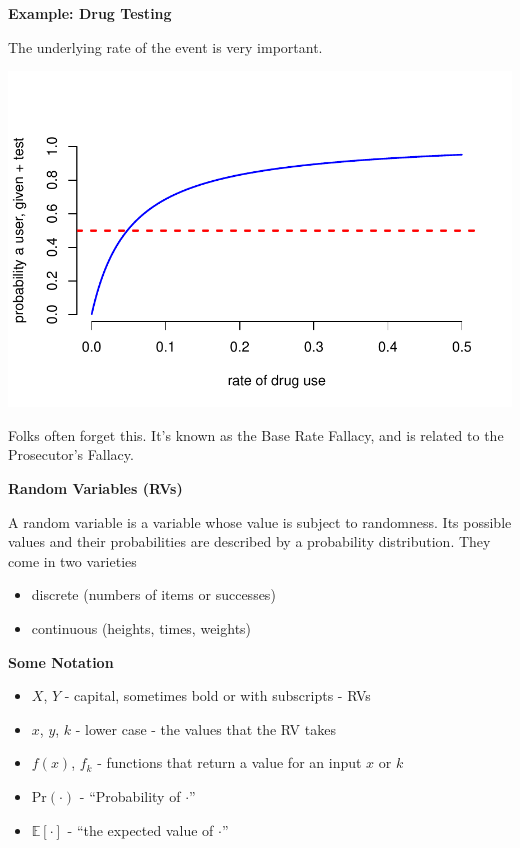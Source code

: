 \documentclass[12pt,xcolor=svgnames]{beamer}
\newcommand{\rd}{\color{red}}
\newcommand{\theme}{\color{FireBrick}}
\newcommand{\ds}[1]{\mathds{#1}}
\newcommand{\sk}{\vspace{.4cm}}
\newcommand{\chap}[1]{{\theme \Large \bf #1} \sk}
\newcommand{\E}{\ds{E}}
\newcommand{\pr}{\text{Pr}}
\begin{document}
\begin{frame}
\chap{Example: Drug Testing}

The underlying rate of the event is very important. 

\begin{center}
\includegraphics[scale=0.55,trim=10 10 0 50]{drugtest}
\end{center}

Folks often forget this. It's known as the {\rd Base Rate Fallacy}, and is related to the {\rd Prosecutor's Fallacy}.

\end{frame}

\begin{frame}
\chap{Random Variables (RVs)}

A random variable is a variable whose value is subject to randomness. Its possible values and their probabilities are described by a probability distribution. They come in two varieties

\begin{itemize}
\item discrete (numbers of items or successes)
\item continuous (heights, times, weights)
\end{itemize}

\end{frame}


\begin{frame}
\chap{Some Notation}

\begin{itemize}
\item $X$, $Y$ - capital, sometimes bold or with subscripts - RVs
\item $x$, $y$, $k$ - lower case - the values that the RV takes
\item $f(x)$, $f_k$ - functions that return a value for an input $x$ or $k$
\item $\pr(\cdot)$ - ``Probability of $\cdot$''
\item $\E[\cdot]$ - ``the expected value of $\cdot$''
\end{itemize}

\end{frame}
\end{document}
